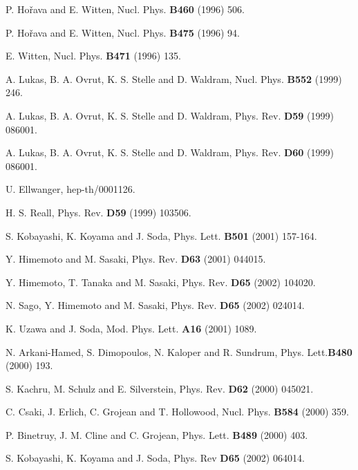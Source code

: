\documentclass[a4paper,11pt]{article}
\begin{document}
\begin{thebibliography}{99}
P. Ho\v{r}ava and E. Witten, Nucl. Phys. {\bf B460} (1996) 506.

P. Ho\v{r}ava and E. Witten, Nucl. Phys. {\bf B475} (1996) 94.

E. Witten, Nucl. Phys. {\bf B471} (1996) 135.

 A. Lukas, B. A. Ovrut, K. S. Stelle and D. Waldram, 
Nucl. Phys. {\bf B552} (1999) 246.

 A. Lukas, B. A. Ovrut, K. S. Stelle and D. Waldram, 
Phys. Rev. {\bf D59} (1999) 086001.

 A. Lukas, B. A. Ovrut, K. S. Stelle and D. Waldram, 
Phys. Rev. {\bf D60} (1999) 086001.

 U. Ellwanger, hep-th/0001126.

 H. S. Reall, Phys. Rev. {\bf D59} (1999) 103506.


 S. Kobayashi, K. Koyama and J. Soda, 
                       Phys. Lett.  {\bf B501} (2001) 157-164.

 Y. Himemoto and M. Sasaki, Phys. Rev. {\bf D63} 
                                                 (2001) 044015. 

 Y. Himemoto, T. Tanaka and M. Sasaki, 
Phys. Rev. {\bf D65} (2002) 104020. 

 N. Sago, Y. Himemoto and M. Sasaki, 
Phys. Rev. {\bf D65} (2002) 024014. 

 K. Uzawa and J. Soda,  
Mod. Phys. Lett. {\bf A16} (2001) 1089.

 N. Arkani-Hamed, S. Dimopoulos, N. Kaloper and
	R. Sundrum,  
Phys. Lett.{\bf B480} (2000) 193. 

 S. Kachru, M. Schulz and E. Silverstein, 
Phys. Rev. {\bf D62} (2000) 045021. 

 C. Csaki, J. Erlich, C. Grojean and T. Hollowood, 
Nucl. Phys. {\bf B584} (2000) 359. 

 P. Binetruy, J. M. Cline and C. Grojean, 
Phys. Lett. {\bf B489} (2000) 403. 


 S. Kobayashi, K. Koyama and J. Soda, 
Phys. Rev {\bf D65} (2002) 064014.


\end{thebibliography}
\end{document}
